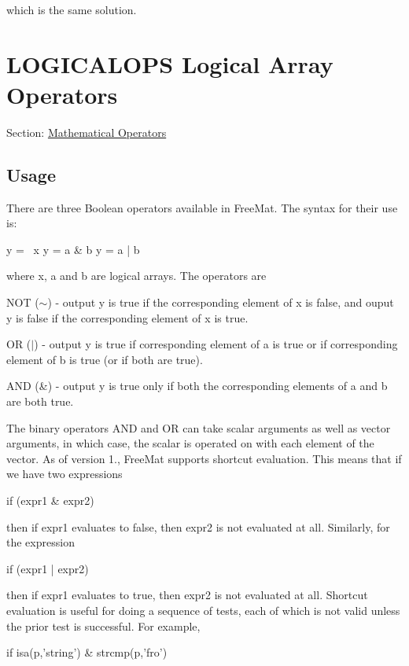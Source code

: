 {\ttfamily which is the same solution. }\hypertarget{operators_logicalops}{}\section{L\-O\-G\-I\-C\-A\-L\-O\-P\-S Logical Array Operators}\label{operators_logicalops}
Section\-: \hyperlink{sec_operators}{Mathematical Operators} \hypertarget{vtkwidgets_vtkxyplotwidget_Usage}{}\subsection{Usage}\label{vtkwidgets_vtkxyplotwidget_Usage}
There are three Boolean operators available in Free\-Mat. The syntax for their use is\-: \begin{DoxyVerb}  y = ~x
  y = a & b
  y = a | b
\end{DoxyVerb}
 where {\ttfamily x}, {\ttfamily a} and {\ttfamily b} are {\ttfamily logical} arrays. The operators are 
\begin{DoxyItemize}
\item N\-O\-T ({\ttfamily $\sim$}) -\/ output {\ttfamily y} is true if the corresponding element of {\ttfamily x} is false, and ouput {\ttfamily y} is false if the corresponding element of {\ttfamily x} is true.  
\item O\-R ({\ttfamily }$|$) -\/ output {\ttfamily y} is true if corresponding element of {\ttfamily a} is true or if corresponding element of {\ttfamily b} is true (or if both are true).  
\item A\-N\-D ({\ttfamily \&}) -\/ output {\ttfamily y} is true only if both the corresponding elements of {\ttfamily a} and {\ttfamily b} are both true.  
\end{DoxyItemize}The binary operators A\-N\-D and O\-R can take scalar arguments as well as vector arguments, in which case, the scalar is operated on with each element of the vector. As of version 1., Free\-Mat supports {\ttfamily shortcut} evaluation. This means that if we have two expressions \begin{DoxyVerb}  if (expr1 & expr2)
\end{DoxyVerb}
 then if {\ttfamily expr1} evaluates to {\ttfamily false}, then {\ttfamily expr2} is not evaluated at all. Similarly, for the expression \begin{DoxyVerb}  if (expr1 | expr2)
\end{DoxyVerb}
 then if {\ttfamily expr1} evaluates to {\ttfamily true}, then {\ttfamily expr2} is not evaluated at all. Shortcut evaluation is useful for doing a sequence of tests, each of which is not valid unless the prior test is successful. For example, \begin{DoxyVerb}  if isa(p,'string') & strcmp(p,'fro')
\end{DoxyVerb}
